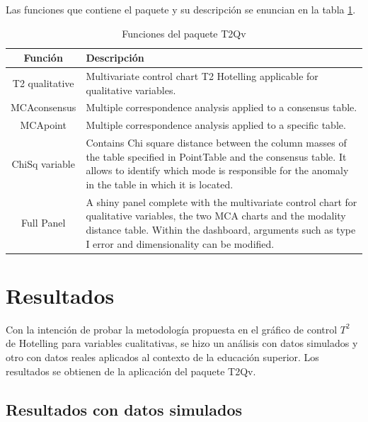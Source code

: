 \documentclass[water,article,submit,moreauthors,pdftex]{mdpi}
\begin{document}
Las funciones que contiene el paquete y su descripción se enuncian en la
tabla \ref{tab:functions}.

\begin{table}[!ht]
\begin{center}
 \begin{tabular}{||c  m{35em}||} 
 \hline
  Función & Descripción \\ [0.5ex] 
 \hline\hline
 T2 qualitative & Multivariate control chart T2 Hotelling applicable for qualitative variables.\\
 \hline
  MCAconsensus & Multiple correspondence analysis applied to a consensus table.\\
\hline
  MCApoint & Multiple correspondence analysis applied to a specific table.\\
\hline
  ChiSq variable & Contains Chi square distance between the column masses of the table specified in PointTable and the consensus table. It allows to identify which mode is responsible for the anomaly in the table in which it is located. \\ [1ex] 
  \hline
  Full Panel & A shiny panel complete with the 
  multivariate control chart for 
  qualitative variables, the two MCA 
  charts and the modality distance table. 
  Within the dashboard, arguments such as 
  type I error and dimensionality can be 
  modified. \\ [1ex] 
 \hline
\end{tabular}\caption{Funciones del paquete T2Qv}
\label{tab:functions}
\end{center}
\end{table}

\hypertarget{resultados}{%
\section{Resultados}\label{resultados}}

Con la intención de probar la metodología propuesta en el gráfico de
control \(T^2\) de Hotelling para variables cualitativas, se hizo un
análisis con datos simulados y otro con datos reales aplicados al
contexto de la educación superior. Los resultados se obtienen de la
aplicación del paquete T2Qv.

\hypertarget{resultados-con-datos-simulados}{%
\subsection{Resultados con datos
simulados}\label{resultados-con-datos-simulados}}
\end{document}
